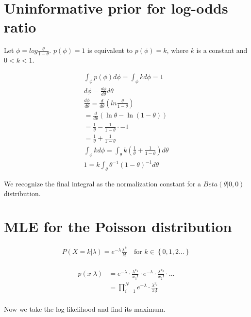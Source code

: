 \documentclass{article}
\begin{document}
\section{Uninformative prior for log-odds ratio}

Let $\phi = log \frac{\theta}{1-\theta}$. $p(\phi) = 1$ is equivalent
to $p(\phi) = k$, where $k$ is a constant and $0 < k < 1$.

\begin{gather*}
  \int_\phi p(\phi) d\phi = \int_\phi k d\phi = 1 \\
  d\phi = \frac{d\phi}{d\theta} d\theta \\
  \frac{d\phi}{d\theta} = \frac{d}{d\theta} \left( ln \frac{\theta}{1 - \theta} \right) \\
  = \frac{d}{d\theta} \left( \ln \theta - \ln (1 - \theta) \right) \\
  = \frac{1}{\theta} - \frac{1}{1 - \theta} \cdot -1 \\
  = \frac{1}{\theta} + \frac{1}{1 - \theta} \\
  \int_\phi k d\phi = \int_\theta k (\frac{1}{\theta} + \frac{1}{1 -
    \theta}) d\theta \\
  1 = k \int_\theta \theta^{-1} (1 - \theta)^{-1} d\theta
\end{gather*}

We recognize the final integral as the normalization constant for a
$Beta(\theta|0,0)$ distribution.

\section{MLE for the Poisson distribution}
\begin{gather*}
  P(X=k|\lambda) = e^{-\lambda}\frac{\lambda^{k}}{k!} \quad \text{for
  } k \in \left\{ 0,1,2... \right\} \\
\end{gather*}

\begin{align*}
  p(x|\lambda) &= e^{-\lambda} \cdot \frac{\lambda^{x_1}}{x_1!} \cdot
  e^{-\lambda} \cdot \frac{\lambda^{x_2}}{x_2!} \cdot ... \\
               &= \prod_{i=1}^N e^{-\lambda} \cdot
                 \frac{\lambda^{x_i}}{x_i!} \\
\end{align*}

Now we take the log-likelihood and find its maximum.
\end{document}
